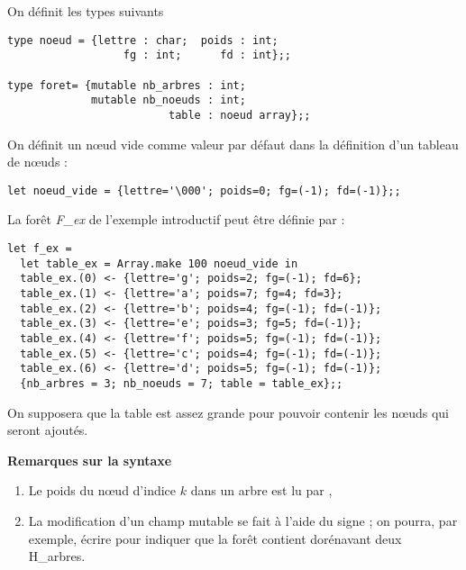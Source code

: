 \newpage
On définit les types suivants
\begin{lstlisting}
type noeud = {lettre : char;  poids : int; 
                  fg : int;      fd : int};;

type foret= {mutable nb_arbres : int; 
             mutable nb_noeuds : int; 
                         table : noeud array};;
\end{lstlisting}
On définit un nœud vide comme valeur par défaut dans la définition d'un tableau de nœuds :
\begin{lstlisting}
let noeud_vide = {lettre='\000'; poids=0; fg=(-1); fd=(-1)};;
\end{lstlisting}
La forêt {\it F\_ex} de l’exemple introductif peut être définie par :
\begin{lstlisting}
let f_ex =
  let table_ex = Array.make 100 noeud_vide in
  table_ex.(0) <- {lettre='g'; poids=2; fg=(-1); fd=6};
  table_ex.(1) <- {lettre='a'; poids=7; fg=4; fd=3};
  table_ex.(2) <- {lettre='b'; poids=4; fg=(-1); fd=(-1)};
  table_ex.(3) <- {lettre='e'; poids=3; fg=5; fd=(-1)};
  table_ex.(4) <- {lettre='f'; poids=5; fg=(-1); fd=(-1)};
  table_ex.(5) <- {lettre='c'; poids=4; fg=(-1); fd=(-1)};
  table_ex.(6) <- {lettre='d'; poids=5; fg=(-1); fd=(-1)};
  {nb_arbres = 3; nb_noeuds = 7; table = table_ex};;
\end{lstlisting}


On supposera que la table est assez grande pour pouvoir contenir les nœuds qui seront ajoutés.

\medskip

{\bf Remarques sur la syntaxe} 

\begin{enumerate}
  \item Le poids du nœud d'indice $k$ dans un arbre  est lu par ,

\item La modification d’un champ mutable se fait à l’aide du signe \type{<-} ; on pourra, par exemple, 
écrire  pour indiquer que la forêt  contient dorénavant deux H\_arbres.
\end{enumerate}


